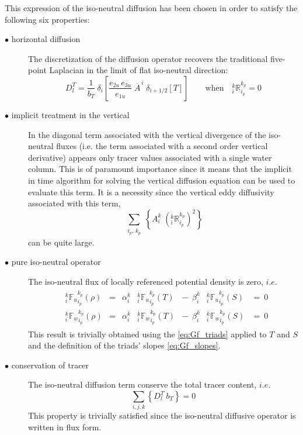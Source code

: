 \documentclass[../main/NEMO_manual]{subfiles}
\begin{document}
This expression of the iso-neutral diffusion has been chosen in order to satisfy the following six properties:
\begin{description}
\item[$\bullet$ horizontal diffusion]
  The discretization of the diffusion operator recovers the traditional five-point Laplacian in
  the limit of flat iso-neutral direction:
  \[
    D_l^T = \frac{1}{b_T}  \ \delta_{i}
    \left[ \frac{e_{2u}\,e_{3u}}{e_{1u}} \; \overline{A}^{\,i} \; \delta_{i+1/2}[T] \right]
    \qquad  \text{when} \quad
    { _i^k \mathbb{R}_{i_p}^{k_p} }=0
  \]

\item[$\bullet$ implicit treatment in the vertical]
  In the diagonal term associated with the vertical divergence of the iso-neutral fluxes
  (i.e. the term associated with a second order vertical derivative)
  appears only tracer values associated with a single water column.
  This is of paramount importance since it means that
  the implicit in time algorithm for solving the vertical diffusion equation can be used to evaluate this term.
  It is a necessity since the vertical eddy diffusivity associated with this term,
  \[
	 \sum_{\substack{i_p, \,k_p}} \left\{
		A_i^k \; \left(_i^k \mathbb{R}_{i_p}^{k_p}\right)^2
    \right\}
  \]
  can be quite large.

\item[$\bullet$ pure iso-neutral operator]
  The iso-neutral flux of locally referenced potential density is zero, $i.e.$
  \begin{align*}
    \begin{matrix}
      &{_i^k {\mathbb{F}_u}_{i_p}^{k_p} (\rho)}
      &=    &\alpha_i^k   &{_i^k {\mathbb{F}_u}_{i_p}^{k_p} } (T)
      &- \ \;  \beta _i^k    &{_i^k {\mathbb{F}_u}_{i_p}^{k_p} } (S) & = \ 0   \\
      &{_i^k {\mathbb{F}_w}_{i_p}^{k_p} (\rho)}
      &=    &\alpha_i^k   &{_i^k {\mathbb{F}_w}_{i_p}^{k_p} } (T)
      &- \  \; \beta _i^k    &{_i^k {\mathbb{F}_w}_{i_p}^{k_p} } (S)  &= \ 0
    \end{matrix}
  \end{align*}
  This result is trivially obtained using the \autoref{eq:Gf_triads} applied to $T$ and $S$ and
  the definition of the triads' slopes \autoref{eq:Gf_slopes}.

\item[$\bullet$ conservation of tracer]
  The iso-neutral diffusion term conserve the total tracer content, $i.e.$
  \[
    \sum_{i,j,k} \left\{ D_l^T \ b_T \right\} = 0
  \]
This property is trivially satisfied since the iso-neutral diffusive operator is written in flux form.


\end{description}
\end{document}
